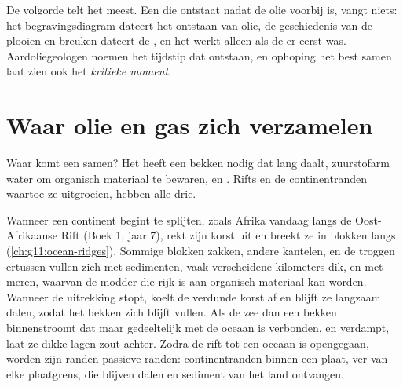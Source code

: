 De volgorde telt het meest. Een  die ontstaat nadat de olie voorbij is, vangt
niets: het begravingsdiagram dateert het ontstaan van olie, de geschiedenis
van de plooien en breuken dateert de , en het  werkt alleen
als de  er eerst was. Aardoliegeologen noemen het tijdstip dat ontstaan,  en
ophoping het best samen laat zien ook het \emph{kritieke
moment}.

\section{Waar olie en gas zich verzamelen}

Waar komt een  samen? Het heeft een bekken nodig dat lang
daalt, zuurstofarm water om organisch materiaal te bewaren, en . Rifts
en de continentranden waartoe ze uitgroeien, hebben alle drie.

Wanneer een continent begint te splijten, zoals Afrika vandaag langs de Oost-Afrikaanse
Rift (Boek 1, jaar 7), rekt zijn korst uit en breekt ze in blokken
langs  (\cref{ch:g11:ocean-ridges}). Sommige blokken zakken, andere
kantelen, en de troggen ertussen vullen zich met sedimenten, vaak verscheidene
kilometers dik, en met meren, waarvan de modder die rijk is aan organisch materiaal
 kan worden. Wanneer
de uitrekking stopt, koelt de verdunde korst af en blijft ze langzaam dalen, zodat
het bekken zich blijft vullen. Als de zee dan een bekken binnenstroomt dat maar
gedeeltelijk met de oceaan is verbonden, en verdampt, laat ze dikke lagen
zout achter. Zodra de rift tot een oceaan is opengegaan, worden zijn randen passieve
randen: continentranden binnen een plaat, ver van elke plaatgrens, die
blijven dalen en sediment van het land ontvangen.

